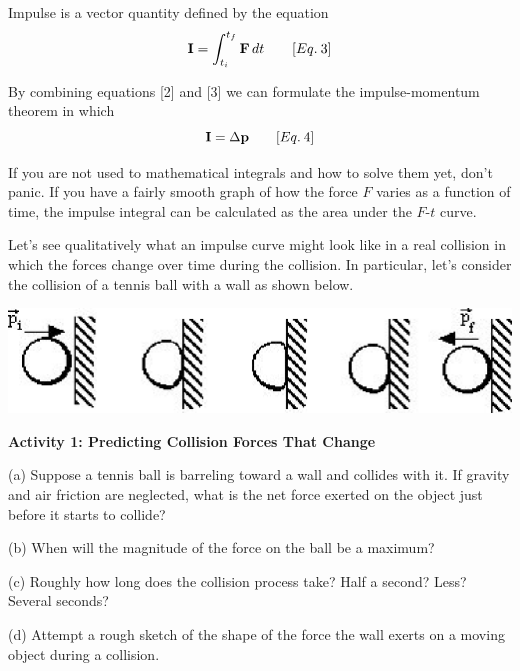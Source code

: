Impulse is a vector quantity defined by the equation
\[
{\bf I}=\int_{t_{i}}^{t_{f}}{\bf F}\,dt\qquad [Eq.\: 3]\]


By combining equations {[}2{]} and {[}3{]} we can formulate the impulse-momentum
theorem in which
\[
{\bf I}=\Delta {\bf p}\qquad [Eq.\: 4]\]


If you are not used to mathematical integrals and how to solve them yet, don't
panic. If you have a fairly smooth graph of how the force $F$ varies as a function
of time, the impulse integral can be calculated as the area under the $F$-$t$ 
curve.

Let's see qualitatively what an impulse curve might look like in a real collision
in which the forces change over time during the collision. In particular, let's
consider the collision of a tennis ball with a wall as shown below.

\vspace{0.3cm}
{\par\centering \includegraphics{impulse/impulse_fig1.eps} \par}
\vspace{0.3cm}

\textbf{Activity 1: Predicting Collision Forces That Change }

(a) Suppose a tennis ball is barreling toward a wall and collides with it. If gravity and air friction are neglected, what is the net force exerted on the object just before it starts to collide?
\vspace{10mm}

(b) When will the magnitude of the force on the ball be a maximum? 
\vspace{10mm}

(c) Roughly how long does the collision process take? Half a second? Less? Several
seconds?
\vspace{10mm}

(d) Attempt a rough sketch of the shape of the force the wall exerts on a moving
object during a collision.

